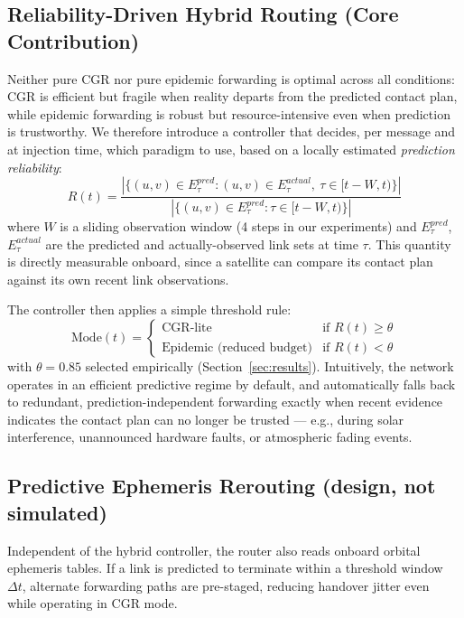 \documentclass[10pt,twocolumn]{article}
\begin{document}
\subsection{Reliability-Driven Hybrid Routing (Core Contribution)}
\label{sec:hybrid}

Neither pure CGR nor pure epidemic forwarding is optimal across all conditions: CGR is efficient but fragile when reality departs from the predicted contact plan, while epidemic forwarding is robust but resource-intensive even when prediction is trustworthy. We therefore introduce a controller that decides, per message and at injection time, which paradigm to use, based on a locally estimated \emph{prediction reliability}:
\begin{equation}
R(t) = \frac{\left|\{(u,v) \in E^{pred}_\tau : (u,v) \in E^{actual}_\tau,\ \tau \in [t-W, t)\}\right|}{\left|\{(u,v) \in E^{pred}_\tau : \tau \in [t-W, t)\}\right|}
\end{equation}
where $W$ is a sliding observation window (4 steps in our experiments) and $E^{pred}_\tau$, $E^{actual}_\tau$ are the predicted and actually-observed link sets at time $\tau$. This quantity is directly measurable onboard, since a satellite can compare its contact plan against its own recent link observations.

The controller then applies a simple threshold rule:
\begin{equation}
\text{Mode}(t) =
\begin{cases}
\text{CGR-lite} & \text{if } R(t) \geq \theta \\
\text{Epidemic (reduced budget)} & \text{if } R(t) < \theta
\end{cases}
\end{equation}
with $\theta = 0.85$ selected empirically (Section~\ref{sec:results}). Intuitively, the network operates in an efficient predictive regime by default, and automatically falls back to redundant, prediction-independent forwarding exactly when recent evidence indicates the contact plan can no longer be trusted --- e.g., during solar interference, unannounced hardware faults, or atmospheric fading events.

\subsection{Predictive Ephemeris Rerouting (design, not simulated)}
Independent of the hybrid controller, the router also reads onboard orbital ephemeris tables. If a link is predicted to terminate within a threshold window $\Delta t$, alternate forwarding paths are pre-staged, reducing handover jitter even while operating in CGR mode.
\end{document}
